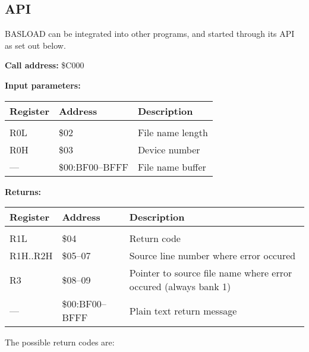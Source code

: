 \documentclass{article}
\begin{document}
    \subsection{API}

        BASLOAD can be integrated into other programs, and started through its
        API as set out below.

        \vspace{1em}
        \textbf{Call address:} \$C000

        \textbf{Input parameters:} 

        \begin{longtable}[l]{l l p{6cm}}
            \textbf{Register} & \textbf{Address} & \textbf{Description} \\
	        \hline \\
            R0L & \$02            & File name length \\
            R0H & \$03            & Device number \\
            ---  & \$00:BF00--BFFF & File name buffer \\
        \end{longtable}
        \vspace{-1.5em}
        \textbf{Returns:} 

        \begin{longtable}[l]{l l p{6cm}}
            \textbf{Register} & \textbf{Address} & \textbf{Description} \\
	        \hline \\
            R1L      & \$04       & Return code \\
            R1H..R2H & \$05--07   & Source line number where error occured \\
            R3       & \$08--09   & Pointer to source file name where error occured (always bank 1) \\
            ---      & \$00:BF00--BFFF & Plain text return message \\
        \end{longtable}

        The possible return codes are:
\end{document}
